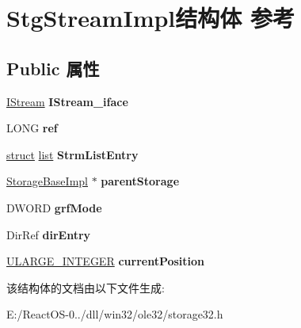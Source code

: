 \hypertarget{struct_stg_stream_impl}{}\section{Stg\+Stream\+Impl结构体 参考}
\label{struct_stg_stream_impl}
\subsection*{Public 属性}
\begin{DoxyCompactItemize}
\item 
\mbox{\label{struct_stg_stream_impl_a5cf0abcd84f9fd64c0dc2067acde5c83}} 
\hyperlink{interface_i_stream}{I\+Stream} {\bfseries I\+Stream\+\_\+iface}
\item 
\mbox{\label{struct_stg_stream_impl_a426110c8d3e79afbd5304a6918956e56}} 
L\+O\+NG {\bfseries ref}
\item 
\mbox{\label{struct_stg_stream_impl_a1961dfbb8e79961982bde1c52dd9e8d8}} 
\hyperlink{interfacestruct}{struct} \hyperlink{classlist}{list} {\bfseries Strm\+List\+Entry}
\item 
\mbox{\label{struct_stg_stream_impl_a6af39cc7c53a26e00c17d3c785fcde87}} 
\hyperlink{struct_storage_base_impl}{Storage\+Base\+Impl} $\ast$ {\bfseries parent\+Storage}
\item 
\mbox{\label{struct_stg_stream_impl_a6bce38a733fe990539bc70c01c43efe1}} 
D\+W\+O\+RD {\bfseries grf\+Mode}
\item 
\mbox{\label{struct_stg_stream_impl_ada778baeb3d1352c0cbced8c2f4eec9a}} 
Dir\+Ref {\bfseries dir\+Entry}
\item 
\mbox{\label{struct_stg_stream_impl_ad3556e3fba86c0f3cc252bc4a2394d6a}} 
\hyperlink{struct___u_l_a_r_g_e___i_n_t_e_g_e_r}{U\+L\+A\+R\+G\+E\+\_\+\+I\+N\+T\+E\+G\+ER} {\bfseries current\+Position}
\end{DoxyCompactItemize}


该结构体的文档由以下文件生成\+:\begin{DoxyCompactItemize}
\item 
E\+:/\+React\+O\+S-\/0../dll/win32/ole32/storage32.\+h\end{DoxyCompactItemize}
